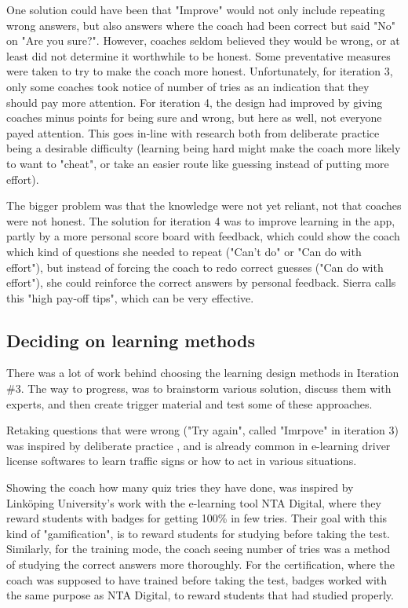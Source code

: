   One solution could have been that "Improve" would not only include repeating wrong answers, but also answers where the coach had been correct but said "No" on "Are you sure?". However, coaches seldom believed they would be wrong, or at least did not determine it worthwhile to be honest. Some preventative measures were taken to try to make the coach more honest. Unfortunately, for iteration 3, only some coaches took notice of number of tries as an indication that they should pay more attention. For iteration 4, the design had improved by giving coaches minus points for being sure and wrong, but here as well, not everyone payed attention. This goes in-line with research both from deliberate practice being a desirable difficulty (learning being hard might make the coach more likely to want to "cheat", or take an easier route like guessing instead of putting more effort).

  The bigger problem was that the knowledge were not yet reliant, not that coaches were not honest. The solution for iteration 4 was to improve learning in the app, partly by a more personal score board with feedback, which could show the coach which kind of questions she needed to repeat ("Can't do" or "Can do with effort"), but instead of forcing the coach to redo correct guesses ("Can do with effort"), she could reinforce the correct answers by personal feedback. Sierra \cite{sierra} calls this "high pay-off tips", which can be very effective.

  \subsection{Deciding on learning methods}
  There was a lot of work behind choosing the learning design methods in Iteration \#3. The way to progress, was to brainstorm various solution, discuss them with experts, and then create trigger material and test some of these approaches.

  Retaking questions that were wrong ("Try again", called "Imrpove" in iteration 3) was inspired by deliberate practice \cite{sierra}, and is already common in e-learning driver license softwares to learn traffic signs or how to act in various situations.

  Showing the coach how many quiz tries they have done, was inspired by Linköping University's work with the e-learning tool NTA Digital, where they reward students with badges for getting 100\% in few tries. Their goal with this kind of "gamification", is to reward students for studying before taking the test. Similarly, for the training mode, the coach seeing number of tries was a method of studying the correct answers more thoroughly. For the certification, where the coach was supposed to have trained before taking the test, badges worked with the same purpose as NTA Digital, to reward students that had studied properly.

